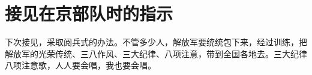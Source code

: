 \section[接见在京部队时的指示（一九六六年十月十三日）]{接见在京部队时的指示}


下次接见，采取阅兵式的办法。不管多少人，解放军要统统包下来，经过训练，把解放军的光荣传统、三八作风、三大纪律、八项注意，带到全国各地去。三大纪律八项注意歌，人人要会唱，我也要会唱。

